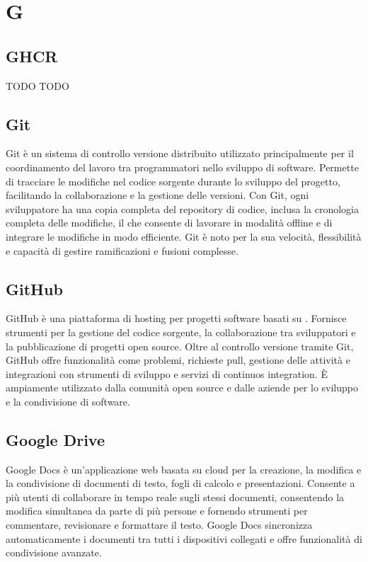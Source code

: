 \section{G}

\vspace{2em}
\subsection*{GHCR}
TODO
TODO

\vspace{2em}
\subsection*{Git}
Git è un sistema di controllo versione distribuito utilizzato principalmente per il coordinamento del lavoro tra programmatori nello sviluppo di software. Permette di tracciare le modifiche nel codice sorgente durante lo sviluppo del progetto, facilitando la collaborazione e la gestione delle versioni. Con Git, ogni sviluppatore ha una copia completa del repository di codice, inclusa la cronologia completa delle modifiche, il che consente di lavorare in modalità offline e di integrare le modifiche in modo efficiente. Git è noto per la sua velocità, flessibilità e capacità di gestire ramificazioni e fusioni complesse.


\vspace{2em}
\subsection*{GitHub}
GitHub è una piattaforma di hosting per progetti software basati su . Fornisce strumenti per la gestione del codice sorgente, la collaborazione tra sviluppatori e la pubblicazione di progetti open source. Oltre al controllo versione tramite Git, GitHub offre funzionalità come problemi, richieste pull, gestione delle attività e integrazioni con strumenti di sviluppo e servizi di continuos integration. È ampiamente utilizzato dalla comunità open source e dalle aziende per lo sviluppo e la condivisione di software.

\vspace{2em}
\subsection*{Google Drive}
Google Docs è un'applicazione web basata su cloud per la creazione, la modifica e la condivisione di documenti di testo, fogli di calcolo e presentazioni. Consente a più utenti di collaborare in tempo reale sugli stessi documenti, consentendo la modifica simultanea da parte di più persone e fornendo strumenti per commentare, revisionare e formattare il testo. Google Docs sincronizza automaticamente i documenti tra tutti i dispositivi collegati e offre funzionalità di condivisione avanzate.

